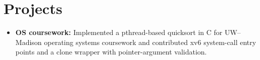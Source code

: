 \documentclass[11pt, letterpaper]{article}
\begin{document}
\section{Projects}
\begin{itemize}
  \item \textbf{OS coursework:} Implemented a pthread-based quicksort in C for UW--Madison operating systems coursework and contributed xv6 system-call entry points and a clone wrapper with pointer-argument validation.
\end{itemize}
\end{document}
